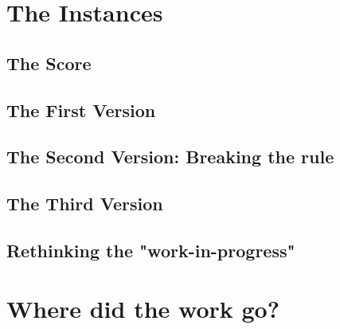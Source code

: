 \section{The Instances}
\label{sec:instances}

\subsection{The Score}
\label{sec:score}

\subsection{The First Version}
\label{sec:first-version}

\subsection{The Second Version: Breaking the rule}
\label{sec:second-vers-break}

\subsection{The Third Version}
\label{sec:third-version}

\subsection{Rethinking the "work-in-progress"}
\label{sec:reth-work-progr}

\section{Where did the work go?}
\label{sec:where-did-work}



